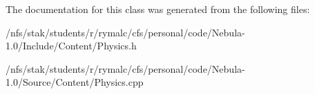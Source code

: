 The documentation for this class was generated from the following files:\begin{DoxyCompactItemize}
\item 
/nfs/stak/students/r/rymalc/cfs/personal/code/Nebula-\/1.0/Include/Content/Physics.h\item 
/nfs/stak/students/r/rymalc/cfs/personal/code/Nebula-\/1.0/Source/Content/Physics.cpp\end{DoxyCompactItemize}
